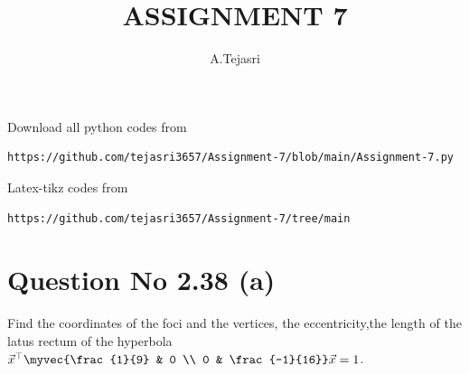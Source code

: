 \documentclass[journal,12pt,twocolumn]{IEEEtran}
\begin{document}
     \def\rightbox#1{\makebox[0in][r]{#1}}
     \def\centbox#1{\makebox[0in]{#1}}
     \def\topbox#1{\raisebox{-\baselineskip}[0in][0in]{#1}}
     \def\midbox#1{\raisebox{-0.5\baselineskip}[0in][0in]{#1}}
\vspace{3cm}
\title{ASSIGNMENT 7}
\author{A.Tejasri}
\maketitle
\newpage
\bigskip
\renewcommand{\thefigure}{\theenumi}
\renewcommand{\thetable}{\theenumi}
Download all python codes from 
\begin{lstlisting}
https://github.com/tejasri3657/Assignment-7/blob/main/Assignment-7.py
\end{lstlisting}
%
Latex-tikz codes from 
%
\begin{lstlisting}
https://github.com/tejasri3657/Assignment-7/tree/main
\end{lstlisting}
%
\section{Question No 2.38 (a)}
 Find the coordinates of the foci and the vertices,
the eccentricity,the length of the latus
rectum of the hyperbola $\vec{x}^{\top}\myvec{\frac{1}{9} & 0 \\ 0 & \frac{-1}{16}}\vec{x} = 1$.
%
\end{document}
